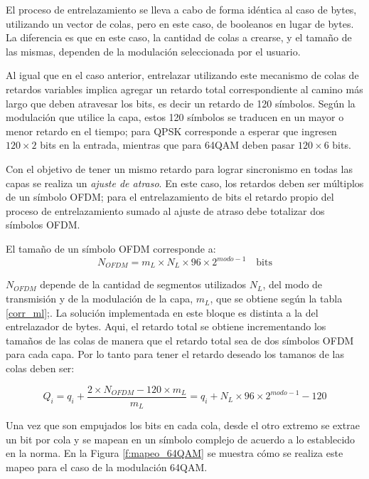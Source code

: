 El proceso de entrelazamiento se lleva a cabo de forma idéntica al caso de bytes, utilizando un vector de colas, pero en este caso, de booleanos en lugar de bytes. La diferencia es que en este caso, la cantidad de colas a crearse, y el tamaño de las mismas, dependen de la modulación seleccionada por el usuario.

Al igual que en el caso anterior, entrelazar utilizando este mecanismo de colas de retardos variables implica agregar un retardo total correspondiente al camino más largo que deben atravesar los bits, es decir un retardo de 120 símbolos. Según la modulación que utilice la capa, estos 120 símbolos se traducen en un mayor o menor retardo en el tiempo; para QPSK corresponde a esperar que ingresen $120 \times 2$ bits en la entrada, mientras que para 64QAM deben pasar $120 \times 6$ bits.

Con el objetivo de tener un mismo retardo para lograr sincronismo en todas las capas se realiza un \textit{ajuste de atraso}. En este caso, los retardos deben ser m\'ultiplos de un s\'imbolo OFDM; para el entrelazamiento de bits el retardo propio del proceso de entrelazamiento sumado al ajuste de atraso debe totalizar dos s\'imbolos OFDM.

El tamaño de un s\'imbolo OFDM corresponde a: 
\begin{equation}
N_{OFDM} = m_L \times N_L \times 96 \times 2^{modo-1} \quad \text{bits}
\end{equation}

$N_{OFDM}$ depende de la cantidad de segmentos utilizados $N_L$, del modo de transmisi\'on y de la modulaci\'on de la capa, $m_L$, que se obtiene según la tabla \ref{corr_ml};. La soluci\'on implementada en este bloque es distinta a la del entrelazador de bytes. Aqui, el retardo total se obtiene incrementando los tamaños de las colas de manera que el retardo total sea de dos s\'imbolos OFDM para cada capa. Por lo tanto para tener el retardo deseado los tamanos de las colas deben ser:

\begin{equation}
Q_i = q_i + \dfrac{2 \times N_{OFDM} - 120 \times m_L}{m_L} = q_i + N_L \times 96 \times 2^{modo-1} - 120
\end{equation}

Una vez que son empujados los bits en cada cola, desde el otro extremo se extrae un bit por cola y se mapean en un s\'imbolo complejo de acuerdo a lo establecido en la norma. En la Figura \ref{f:mapeo_64QAM} se muestra c\'omo se realiza este mapeo para el caso de la modulaci\'on 64QAM. 


